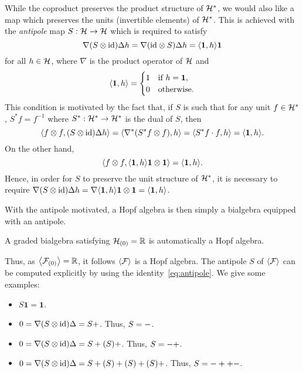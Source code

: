 \documentclass[a4paper, 10pt]{style/preprint}
\begin{document}
While the coproduct preserves the product structure of \({\mathcal H}^*\), we would also like a map which 
preserves the units (invertible elements) of \({\mathcal H}^*\). This is achieved with the \textit{antipole} 
map \(S : {\mathcal H} \to {\mathcal H}\) which is required to satisfy
\begin{equation}\label{eq:antipole}
  \nabla (S \otimes \text{id}) \Delta h = \nabla (\text{id} \otimes S) \Delta h = \< \mathbf{1}, h\> \mathbf{1}
\end{equation}
for all \(h \in {\mathcal H}\), where \(\nabla\) is the product operator of \({\mathcal H}\) and 
\[\<\mathbf{1}, h\> = 
\begin{cases}
  1 & \text{if } h = \mathbf{1},\\
  0 & \text{otherwise}.
\end{cases}\]
This condition is motivated by the fact that, if \(S\) is such that for any unit \(f \in {\mathcal H}^*\), 
\(S^* f = f^{-1}\) where \(S^* : {\mathcal H}^* \to {\mathcal H}^*\) is the dual of \(S\), then
\[\< f \otimes f, (S \otimes \text{id})\Delta h\> 
  = \< \nabla^* (S^* f \otimes f), h\> = \< S^* f \cdot f, h\> = \< \mathbf{1}, h\>.\]
On the other hand, 
\[\< f \otimes f, \< \mathbf{1}, h\> \mathbf{1} \otimes \mathbf{1}\> = \< \mathbf{1}, h\>.\]
Hence, in order for \(S\) to preserve the unit structure of \({\mathcal H}^*\), it is necessary to require
\(\nabla (S \otimes \text{id})\Delta h = \nabla \< \mathbf{1}, h\> \mathbf{1} \otimes \mathbf{1} 
= \< \mathbf{1}, h\>\). 

With the antipole motivated, a Hopf algebra is then simply a bialgebra equipped with an antipole.

\begin{proposition}
  A graded bialgebra satisfying \({\mathcal H}_{(0)} = \mathbb{R}\) is automatically a Hopf algebra.
\end{proposition}

Thus, as \(\< \CF_{(0)}\> = \mathbb{R}\), it follows \(\< \CF\>\) is a Hopf algebra.
The antipole \(S\) of \(\< \CF\>\) can be computed explicitly by using the identity~\eqref{eq:antipole}. 
We give some examples:
\begin{itemize}
  \item \(S \mathbf{1} = \mathbf{1}\).
  \item \(0 = \nabla (S \otimes \text{id}) \Delta \tree<X> = S \tree<X> + \tree<X>\). Thus, \(S \tree<X> = -\tree<X>\).
  \item \(0 = \nabla (S \otimes \text{id}) \Delta \tree<1> = S \tree<1> + (S \tree<Xb>) \tree<X> + \tree<1>\). 
    Thus, \(S \tree<1> = -\tree<1> + \tree<X> \tree<Xb>\).
  \item \(0 = \nabla (S \otimes \text{id}) \Delta \tree<2> = S \tree<2> + (S \tree<Xb> \tree<Xc>) \tree<X> + (S \tree<Xc>) \tree<1> + (S \tree<Xb>) \tree<1ac> + \tree<2>\).
    Thus, \(S \tree<2> = -\tree<2> + \tree<Xc> \tree<1> + \tree<Xb> \tree<1ac> - \tree<X> \tree<Xb> \tree<Xc>\).
\end{itemize}
\end{document}
